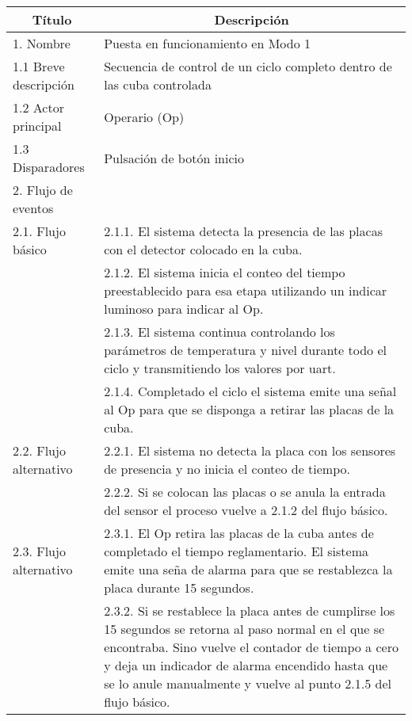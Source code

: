\begin{table}[h!]
\begin{flushleft}
\begin{tabular}{|m{3cm}|m{11cm}|}\hline

\multicolumn{1}{|c|}{\textbf{Título}} & \multicolumn{1}{c|}{\textbf{Descripción}} \\ \hline
1. Nombre & Puesta en funcionamiento en Modo 1 \\ \hline
1.1 Breve descripción  & Secuencia de control de un ciclo completo dentro de las cuba controlada  \\ \hline
1.2 Actor principal  & Operario (Op) \\ \hline
1.3 Disparadores  & Pulsación de botón inicio \\ \hline
2. Flujo de eventos &  \\ \hline
\multicolumn{ 1}{|l|}{2.1. Flujo básico} & 2.1.1. El sistema detecta la presencia de las placas con el detector colocado en la cuba. \\ \cline{ 2- 2}
\multicolumn{ 1}{|l|}{} & 2.1.2. El sistema inicia el conteo del tiempo preestablecido para esa etapa utilizando un indicar luminoso para indicar al Op. \\ \cline{ 2- 2}
\multicolumn{ 1}{|l|}{} & 2.1.3. El sistema continua controlando los parámetros de temperatura y nivel durante todo el ciclo y transmitiendo los valores por uart. \\ \cline{ 2- 2}
\multicolumn{ 1}{|l|}{} & 2.1.4. Completado el ciclo el sistema emite una señal al Op para que se disponga a retirar las placas de la cuba. \\ \hline
\multicolumn{ 1}{|l|}{2.2. Flujo alternativo } & 2.2.1. El sistema no detecta la placa con los sensores de presencia y no inicia el conteo de tiempo. \\ \cline{ 2- 2}
\multicolumn{ 1}{|l|}{} & 2.2.2. Si se colocan las placas o se anula la entrada del sensor el proceso vuelve a 2.1.2 del flujo básico. \\ \hline
\multicolumn{ 1}{|l|}{2.3. Flujo alternativo } & 2.3.1. El Op retira las placas de la cuba antes de completado el tiempo reglamentario. El sistema emite una seña de alarma para que se restablezca la placa durante 15 segundos. \\ \cline{ 2- 2}
\multicolumn{ 1}{|l|}{} & 2.3.2. Si se restablece la placa antes de cumplirse los 15 segundos se retorna al paso normal en el que se encontraba. Sino vuelve el contador de tiempo a cero y deja un indicador de alarma encendido hasta que se lo anule manualmente y vuelve al punto 2.1.5 del flujo básico. \\ \hline

\end{tabular}
\end{flushleft}
\end{table}
